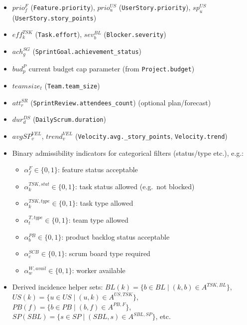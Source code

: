 \documentclass[11pt,a4paper]{article}
\begin{document}
\begin{itemize}[leftmargin=2em]
  \item $prio^F_f$ (\texttt{Feature.priority}), $prio^{US}_{u}$ (\texttt{UserStory.priority}), $sp^{US}_{u}$ (\texttt{UserStory.story\_points})
  \item $eff^{TSK}_{k}$ (\texttt{Task.effort}), $sev^{BL}_b$ (\texttt{Blocker.severity})
  \item $ach^{SG}_g$ (\texttt{SprintGoal.achievement\_status})
  \item $bud^{P}_p$ current budget cap parameter (from \texttt{Project.budget})
  \item $teamsize_t$ (\texttt{Team.team\_size})
  \item $att^{SR}_{r}$ (\texttt{SprintReview.attendees\_count}) \quad(optional plan/forecast)
  \item $dur^{DS}_{d}$ (\texttt{DailyScrum.duration})
  \item $avgSP^{VEL}_{v}$, $trend^{VEL}_{v}$ (\texttt{Velocity.avg.\_story\_points}, \texttt{Velocity.trend})
  \item Binary admissibility indicators for categorical filters (status/type etc.), e.g.:
    \begin{itemize}
      \item $\alpha^F_f\in\{0,1\}$: feature status acceptable
      \item $\alpha^{TSK,stat}_k\in\{0,1\}$: task status allowed (e.g.\ not blocked)
      \item $\alpha^{TSK,type}_k\in\{0,1\}$: task type allowed
      \item $\alpha^{T,type}_t\in\{0,1\}$: team type allowed
      \item $\alpha^{PB}_b\in\{0,1\}$: product backlog status acceptable
      \item $\alpha^{SCB}_c\in\{0,1\}$: scrum board type required
      \item $\alpha^{W,avail}_w\in\{0,1\}$: worker available
    \end{itemize}
  \item Derived incidence helper sets: $BL(k)=\{b\in BL\mid (k,b)\in A^{TSK,BL}\}$, $US(k)=\{u\in US\mid (u,k)\in A^{US,TSK}\}$, $PB(f)=\{b\in PB\mid (b,f)\in A^{PB,F}\}$, $SP(SBL)=\{s\in SP\mid (SBL,s)\in A^{SBL,SP}\}$, etc.
\end{itemize}

\end{document}
